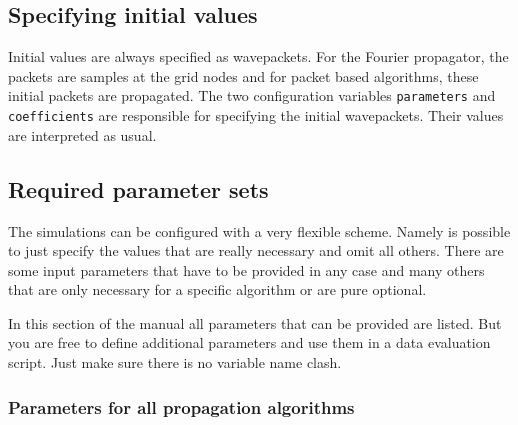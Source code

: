 \documentclass[a4paper,10pt]{report}
\begin{document}
\subsection{Specifying initial values}


Initial values are always specified as wavepackets. For the Fourier propagator,
the packets are samples at the grid nodes and for packet based algorithms, these
initial packets are propagated. The two configuration variables \texttt{parameters}
and \texttt{coefficients} are responsible for specifying the initial wavepackets.
Their values are interpreted as usual.

\subsection{Required parameter sets}

The simulations can be configured with a very flexible scheme. Namely is possible
to just specify the values that are really necessary and omit all others. There
are some input parameters that have to be provided in any case and many others that
are only necessary for a specific algorithm or are pure optional.

In this section of the manual all parameters that can be provided are listed.
But you are free to define additional parameters and use them in a data evaluation
script. Just make sure there is no variable name clash.


\subsubsection{Parameters for all propagation algorithms}
\end{document}
